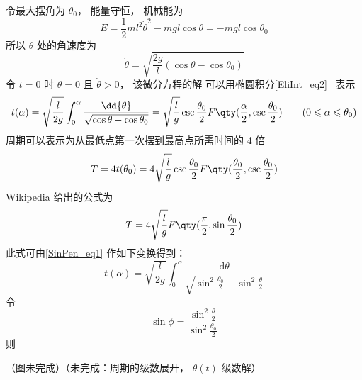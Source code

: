 

令最大摆角为 $\theta_0$， 能量守恒， 机械能为
\begin{equation}
E = \frac{1}{2} m l^2 \dot \theta^2 - mg l \cos\theta = - mg l \cos\theta_0
\end{equation}
所以 $\theta$ 处的角速度为
\begin{equation}
\dot{\theta} = \sqrt{\frac{2g}{l} (\cos\theta - \cos\theta_0) }
\end{equation}
令 $t = 0$ 时 $\theta = 0$ 且 $\dot{\theta} > 0$， 该微分方程的解%
可以用椭圆积分\autoref{EliInt_eq2}~ 表示
\begin{equation}\label{SinPen_eq1}
t(\alpha) = \sqrt{\frac{l}{2g}} \int_0^{\alpha} \frac{\dd{\theta}}{\sqrt{\cos\theta - \cos\theta_0}}
= \sqrt{\frac{l}{g}} \csc\frac{\theta_0}{2} F\qty(\frac{\alpha}{2}, \csc\frac{\theta_0}{2})
\qquad (0 \leqslant \alpha \leqslant \theta_0)
\end{equation}
周期可以表示为从最低点第一次摆到最高点所需时间的 4 倍
\begin{equation}
T = 4t(\theta_0) = 4 \sqrt{\frac{l}{g}} \csc\frac{\theta_0}{2} F\qty(\frac{\theta_0}{2}, \csc\frac{\theta_0}{2})
\end{equation}
Wikipedia 给出的公式为
\begin{equation}
T = 4 \sqrt{\frac{l}{g}} F\qty(\frac{\pi}{2}, \sin\frac{\theta_0}{2})
\end{equation}
此式可由\autoref{SinPen_eq1} 作如下变换得到：
\begin{equation}
t(\alpha)=\sqrt{\frac{l}{2g}}\int_{0}^{\alpha}\frac{\mathrm{d}\theta}{\sqrt{\sin^2\frac{\theta_0}2-\sin^2\frac{\theta}2}}
\end{equation}
令
\begin{equation}
\sin \phi=\frac{\sin^2\frac{\theta}2}{\sin^2\frac{\theta_0}2}
\end{equation}
则
\begin{equation}

\end{equation}

（图未完成）（未完成：周期的级数展开， $\theta(t)$ 级数解）
